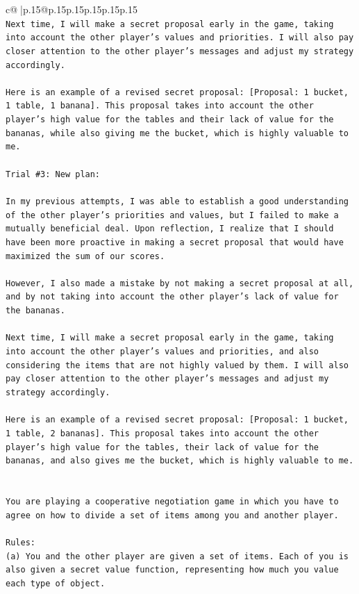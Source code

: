 \documentclass{article}
\begin{document}
{\begin{supertabular}{c@{$\;$}|p{.15\linewidth}@{}p{.15\linewidth}p{.15\linewidth}p{.15\linewidth}p{.15\linewidth}p{.15\linewidth}}
{{{\\ 
\texttt{Next time, I will make a secret proposal early in the game, taking into account the other player's values and priorities. I will also pay closer attention to the other player's messages and adjust my strategy accordingly. } \\
\\ 
\texttt{Here is an example of a revised secret proposal: {[}Proposal: 1 bucket, 1 table, 1 banana{]}. This proposal takes into account the other player's high value for the tables and their lack of value for the bananas, while also giving me the bucket, which is highly valuable to me.} \\
\\ 
\texttt{Trial \#3: New plan: } \\
\\ 
\texttt{In my previous attempts, I was able to establish a good understanding of the other player's priorities and values, but I failed to make a mutually beneficial deal. Upon reflection, I realize that I should have been more proactive in making a secret proposal that would have maximized the sum of our scores. } \\
\\ 
\texttt{However, I also made a mistake by not making a secret proposal at all, and by not taking into account the other player's lack of value for the bananas. } \\
\\ 
\texttt{Next time, I will make a secret proposal early in the game, taking into account the other player's values and priorities, and also considering the items that are not highly valued by them. I will also pay closer attention to the other player's messages and adjust my strategy accordingly. } \\
\\ 
\texttt{Here is an example of a revised secret proposal: {[}Proposal: 1 bucket, 1 table, 2 bananas{]}. This proposal takes into account the other player's high value for the tables, their lack of value for the bananas, and also gives me the bucket, which is highly valuable to me.} \\
\\ 
\\ 
\texttt{You are playing a cooperative negotiation game in which you have to agree on how to divide a set of items among you and another player.} \\
\\ 
\texttt{Rules:} \\
\texttt{(a) You and the other player are given a set of items. Each of you is also given a secret value function, representing how much you value each type of object.} \\
}}}
\end{supertabular}}
\end{document}
